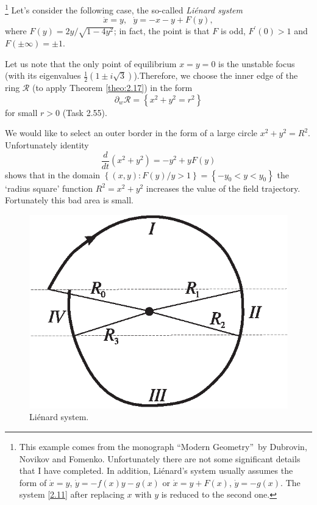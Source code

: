 \begin{example}\footnote{This example comes from the monograph \textquotedblleft Modern Geometry\textquotedblright\ by Dubrovin, Novikov and Fomenko. Unfortunately there are not some significant details that I have completed. In addition, Liénard's system usually assumes the form of $ \dot {x} = y $, $ \dot {y} = -f(x)y - g (x) $ or $\dot{x} = y + F(x)$, $\dot{y} = -g(x)$. The system \eqref{2.11} after replacing $ x $ with $ y $ is reduced to the second one.} \label{example:2.20}
	Let's consider the following case, the so-called \emph{Liénard system}
	\begin{equation}
	\label{2.11}
	\dot{x}=y,\text{ \ \ }\dot{y}=-x-y+F(y),
	\end{equation}
	where $F(y)=2y/\sqrt{1-4y^{2}}$; in fact, the point is that $ F $ is odd, $F^{\prime }(0)>1$ and $F(\pm \infty )=\pm 1$.
	
	Let us note that the only point of equilibrium $ x = y = 0 $ is the unstable focus (with its eigenvalues $\frac{1}{2}(1\pm i\sqrt{3}) $).Therefore, we choose the inner edge of the ring $\mathcal{R}$ (to apply Theorem \ref{theo:2.17}) in the form
	$$
	\partial _{w}\mathcal{R}=\left\{ x^{2}+y^{2}=r^{2}\right\}
	$$
	for small $ r> 0 $ (Task 2.55).
	
	We would like to select an outer border in the form of a large circle $ x ^ {2} + y ^ {2} = R ^ {2}. $ Unfortunately identity
	$$
	\frac{d}{dt}\left( x^{2}+y^{2}\right) =-y^{2}+yF(y)
	$$
	shows that in the domain $\left\{ \left( x,y\right) :F(y)/y>1\right\}
	=\left\{ -y_{0}<y<y_{0}\right\} $ the `radius square' function $ R ^ {2} = x ^ {2} + y ^ {2} $ increases the value of the field trajectory. Fortunately this bad area is small.
	
	\begin{figure}[!ht]
		\centering
		\includegraphics [scale=1]{jtr29}
		\caption{Liénard system.}
		\label{fig:2.9}
	\end{figure}


\end{example}

